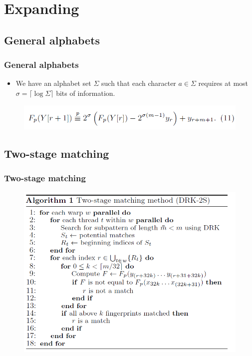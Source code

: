 \section{Expanding}

\subsection{General alphabets}
\begin{frame}
	\frametitle{General alphabets}
	\begin{itemize}
		\item We have an alphabet set $\Sigma$  such that each character $a \in \Sigma$ requires at most 
		$\sigma = \lceil \log \Sigma \rceil$ bits of information.
	\end{itemize}
	\begin{figure}
		\includegraphics[scale=0.50]{figure/fig-general-alpha.png}
	\end{figure}
\end{frame}

\subsection{Two-stage matching}
\begin{frame}
	\frametitle{Two-stage matching}
	\begin{figure}
		\includegraphics[scale=0.40]{figure/fig-2-stage.png}
	\end{figure}
\end{frame}